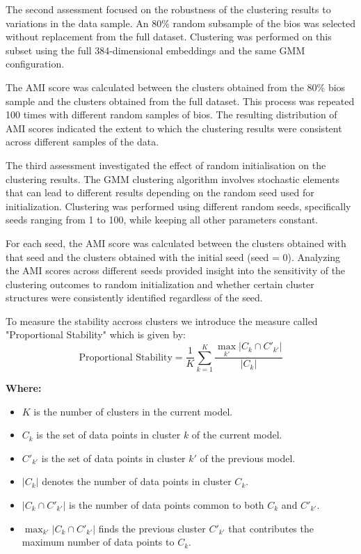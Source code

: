 \documentclass{article}
\begin{document}
The second assessment focused on the robustness of the clustering results to variations in the data sample. An 80\% random subsample of the bios was selected without replacement from the full dataset. Clustering was performed on this subset using the full 384-dimensional embeddings and the same GMM configuration.

The AMI score was calculated between the clusters obtained from the 80\% bios sample and the clusters obtained from the full dataset. This process was repeated 100 times with different random samples of bios. The resulting distribution of AMI scores indicated the extent to which the clustering results were consistent across different samples of the data.



The third assessment investigated the effect of random initialisation on the clustering results. The GMM clustering algorithm involves stochastic elements that can lead to different results depending on the random seed used for initialization. Clustering was performed using different random seeds, specifically seeds ranging from 1 to 100, while keeping all other parameters constant.

For each seed, the AMI score was calculated between the clusters obtained with that seed and the clusters obtained with the initial seed (seed = 0). Analyzing the AMI scores across different seeds provided insight into the sensitivity of the clustering outcomes to random initialization and whether certain cluster structures were consistently identified regardless of the seed.



To measure the stability accross clusters we introduce the measure called "Proportional Stability" which is given by:
\begin{equation}
\text{Proportional Stability} = \frac{1}{K} \sum_{k=1}^{K} \frac{\displaystyle \max_{k'} \left| C_k \cap C'_{k'} \right|}{\left| C_k \right|}
\label{eq:Stability}
\end{equation}

\noindent
\textbf{Where:}

\begin{itemize}
    \item $K$ is the number of clusters in the current model.
    \item $C_k$ is the set of data points in cluster $k$ of the current model.
    \item $C'_{k'}$ is the set of data points in cluster $k'$ of the previous model.
    \item $\left| C_k \right|$ denotes the number of data points in cluster $C_k$.
    \item $\left| C_k \cap C'_{k'} \right|$ is the number of data points common to both $C_k$ and $C'_{k'}$.
    \item $\displaystyle \max_{k'} \left| C_k \cap C'_{k'} \right|$ finds the previous cluster $C'_{k'}$ that contributes the maximum number of data points to $C_k$.
\end{itemize}
\end{document}

